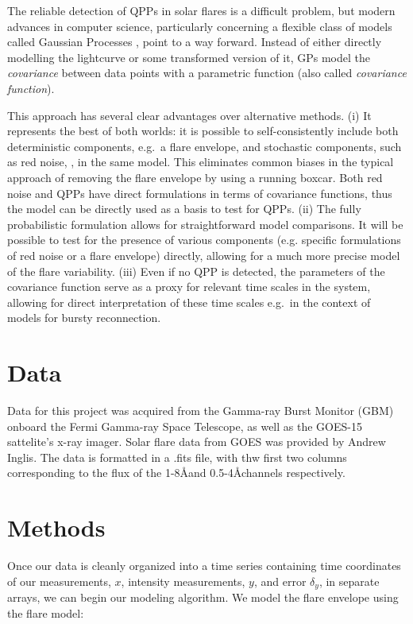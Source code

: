 \documentclass{aastex61}
\begin{document}
The reliable detection of QPPs in solar flares is a difficult problem, but modern advances in computer science, particularly concerning a flexible class of models called Gaussian Processes \citep[GPs;][]{rasmussen2006}, point to a way forward. Instead of either directly modelling the lightcurve or some transformed version of it, GPs model the \textit{covariance} between data points with a parametric function (also called \textit{covariance function}). 

This approach has several clear advantages over alternative methods. (i) It represents the best of both worlds: it is possible to self-consistently include both deterministic components, e.g.\ a flare envelope, and stochastic components, such as red noise, \citep{aigrain2015}, in the same model. This eliminates common biases in the typical approach of removing the flare envelope by using a running boxcar. %
Both red noise and QPPs have direct formulations in terms of covariance functions, thus the model can be directly used as a basis to test for QPPs. 
(ii) The fully probabilistic formulation allows for straightforward model comparisons. It will be possible to test for the presence of various components (e.g. specific formulations of red noise or a flare envelope) directly, allowing for a much more precise model of the flare variability.
(iii) Even if no QPP is detected, the parameters of the covariance function serve as a proxy for relevant time scales in the system, allowing for direct interpretation of these time scales e.g.\ in the context of models for bursty reconnection. 



\section{Data} \label{sec:data}
Data for this project was acquired from the Gamma-ray Burst Monitor (GBM) onboard the Fermi Gamma-ray Space Telescope, as well as the GOES-15 sattelite's x-ray imager.
Solar flare data from GOES  was provided by Andrew Inglis.
The data is formatted in a .fits file, with thw first two columns corresponding to the flux of the 1-8\AA and 0.5-4\AA channels respectively.



\section{Methods} \label{sec:methods}
Once our data is cleanly organized into a time series containing time coordinates of our measurements, $x$, intensity measurements, $y$, and error $\delta_y$, in separate arrays, we can begin our modeling algorithm. We model the flare envelope using the flare model:
\end{document}
